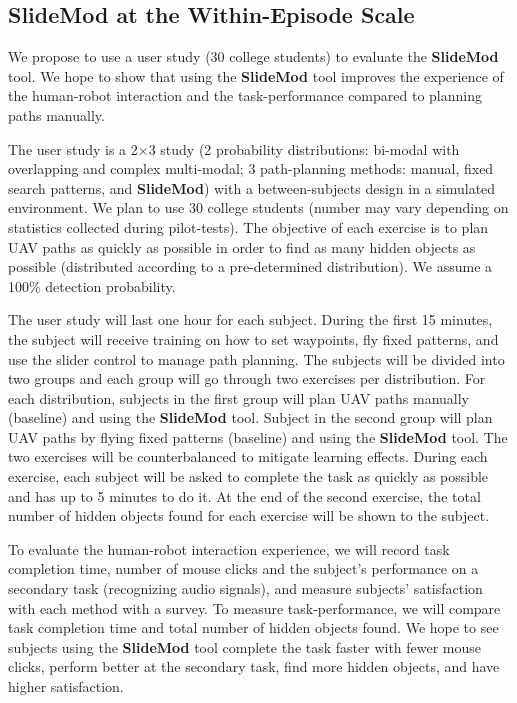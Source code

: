 \subsection{\textbf{SlideMod} at the Within-Episode Scale}

We propose to use a user study (30 college students) to evaluate the \textbf{SlideMod} tool. We hope to show that using the \textbf{SlideMod} tool improves the experience of the human-robot interaction and the task-performance compared to planning paths manually.

The user study is a 2$\times$3 study (2 probability distributions: bi-modal with overlapping and complex multi-modal; 3 path-planning methods: manual, fixed search patterns, and \textbf{SlideMod}) with a between-subjects design in a simulated environment. We plan to use 30 college students (number may vary depending on statistics collected during pilot-tests). The objective of each exercise is to plan UAV paths as quickly as possible in order to find as many hidden objects as possible (distributed according to a pre-determined distribution). We assume a 100\% detection probability.

The user study will last one hour for each subject. During the first 15 minutes, the subject will receive training on how to set waypoints, fly fixed patterns, and use the slider control to manage path planning. The subjects will be divided into two groups and each group will go through two exercises per distribution. For each distribution, subjects in the first group will plan UAV paths manually (baseline) and using the \textbf{SlideMod} tool. Subject in the second group will plan UAV paths by flying fixed patterns (baseline) and using the \textbf{SlideMod} tool. The two exercises will be counterbalanced to mitigate learning effects. During each exercise, each subject will be asked to complete the task as quickly as possible and has up to 5 minutes to do it. At the end of the second exercise, the total number of hidden objects found for each exercise will be shown to the subject.

To evaluate the human-robot interaction experience, we will record task completion time, number of mouse clicks and the subject's performance on a secondary task (recognizing audio signals), and measure subjects' satisfaction with each method with a survey. To measure task-performance, we will compare task completion time and total number of hidden objects found. We hope to see subjects using the \textbf{SlideMod} tool complete the task faster with fewer mouse clicks, perform better at the secondary task, find more hidden objects, and have higher satisfaction.

